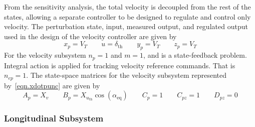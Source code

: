 From the sensitivity analysis, the total velocity is decoupled from the rest of the states, allowing a separate controller to be designed to regulate and control only velocity.
The perturbation state, input, measured output, and regulated output used in the design of the velocity controller are given by
\begin{equation*}
  x_{p} = V_{T}
  \qquad
  u = \delta_{\text{th}}
  \qquad
  y_{p} = V_{T}
  \qquad
  z_{p} = V_{T}
\end{equation*}
For the velocity subsystem $n_{p}=1$ and $m=1$, and is a state-feedback problem.
Integral action is applied for tracking velocity reference commands.
That is $n_{ep}=1$.
The state-space matrices for the velocity subsystem represented by\ \eqref{eqn.xdotpunc} are given by
\begin{equation*}
  A_{p} = X_{v}
  \qquad
  B_{p} = X_{u_{\text{th}}}\cos(\alpha_{\text{eq}})
  \qquad
  C_{p} = 1
  \qquad
  C_{pz} = 1
  \qquad
  D_{pz} = 0
\end{equation*}

\subsubsection{Longitudinal Subsystem}

